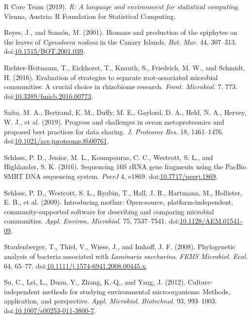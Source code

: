 \documentclass[12pt,]{article}
\begin{document}
\leavevmode\hypertarget{ref-RCoreTeam2019}{}%
R Core Team (2019). \emph{R: A language and environment for statistical
computing}. Vienna, Austria: R Foundation for Statistical Computing.

\leavevmode\hypertarget{ref-Reyes2001}{}%
Reyes, J., and Sansón, M. (2001). Biomass and production of the
epiphytes on the leaves of \emph{Cymodocea nodosa} in the Canary
Islands. \emph{Bot. Mar.} 44, 307--313.
doi:\href{https://doi.org/10.1515/BOT.2001.039}{10.1515/BOT.2001.039}.

\leavevmode\hypertarget{ref-Richter-Heitmann2016}{}%
Richter-Heitmann, T., Eickhorst, T., Knauth, S., Friedrich, M. W., and
Schmidt, H. (2016). Evaluation of strategies to separate root-associated
microbial communities: A crucial choice in rhizobiome research.
\emph{Front. Microbiol.} 7, 773.
doi:\href{https://doi.org/10.3389/fmicb.2016.00773}{10.3389/fmicb.2016.00773}.

\leavevmode\hypertarget{ref-Saito2019}{}%
Saito, M. A., Bertrand, E. M., Duffy, M. E., Gaylord, D. A., Held, N.
A., Hervey, W. J., et al. (2019). Progress and challenges in ocean
metaproteomics and proposed best practices for data sharing. \emph{J.
Proteome Res.} 18, 1461--1476.
doi:\href{https://doi.org/10.1021/acs.jproteome.8b00761}{10.1021/acs.jproteome.8b00761}.

\leavevmode\hypertarget{ref-Schloss2016}{}%
Schloss, P. D., Jenior, M. L., Koumpouras, C. C., Westcott, S. L., and
Highlander, S. K. (2016). Sequencing 16S rRNA gene fragments using the
PacBio SMRT DNA sequencing system. \emph{PeerJ} 4, e1869.
doi:\href{https://doi.org/10.7717/peerj.1869}{10.7717/peerj.1869}.

\leavevmode\hypertarget{ref-Schloss2009}{}%
Schloss, P. D., Westcott, S. L., Ryabin, T., Hall, J. R., Hartmann, M.,
Hollister, E. B., et al. (2009). Introducing mothur: Open-source,
platform-independent, community-supported software for describing and
comparing microbial communities. \emph{Appl. Environ. Microbiol.} 75,
7537--7541.
doi:\href{https://doi.org/10.1128/AEM.01541-09}{10.1128/AEM.01541-09}.

\leavevmode\hypertarget{ref-Staufenberger2008}{}%
Staufenberger, T., Thiel, V., Wiese, J., and Imhoff, J. F. (2008).
Phylogenetic analysis of bacteria associated with \emph{Laminaria
saccharina}. \emph{FEMS Microbiol. Ecol.} 64, 65--77.
doi:\href{https://doi.org/10.1111/j.1574-6941.2008.00445.x}{10.1111/j.1574-6941.2008.00445.x}.

\leavevmode\hypertarget{ref-Su2012}{}%
Su, C., Lei, L., Duan, Y., Zhang, K.-Q., and Yang, J. (2012).
Culture-independent methods for studying environmental microorganisms:
Methods, application, and perspective. \emph{Appl. Microbiol.
Biotechnol.} 93, 993--1003.
doi:\href{https://doi.org/10.1007/s00253-011-3800-7}{10.1007/s00253-011-3800-7}.
\end{document}
